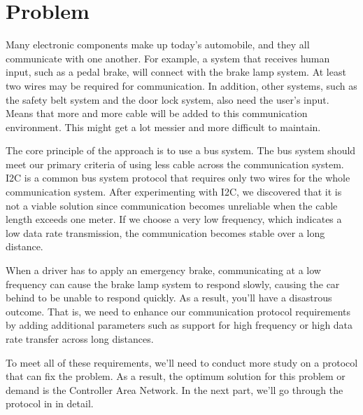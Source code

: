 
\section{Problem}

Many electronic components make up today's automobile, and they all communicate with one another. For example, a system that receives human input, such as a pedal brake, will connect with the brake lamp system. At least two wires may be required for communication. In addition, other systems, such as the safety belt system and the door lock system, also  need the user's input. Means that more and more cable will be added to this communication environment. This might get a lot messier and more difficult to maintain.

The core principle of the approach is to use a bus system. The bus system should meet our primary criteria of using less cable across the communication system. I2C is a common bus system protocol that requires only two wires for the whole communication system. After experimenting with I2C, we discovered that it is not a viable solution since communication becomes unreliable when the cable length exceeds one meter. If we choose a very low frequency, which indicates a low data rate transmission, the communication becomes stable over a long distance.

When a driver has to apply an emergency brake, communicating at a low frequency can cause the brake lamp system to respond slowly, causing the car behind to be unable to respond quickly. As a result, you'll have a disastrous outcome. That is, we need to enhance our communication protocol requirements by adding additional parameters such as support for high frequency or high data rate transfer across long distances.

To meet all of these requirements, we'll need to conduct more study on a protocol that can fix the problem. As a result, the optimum solution for this problem or demand is the Controller Area Network. In the next part, we'll go through the protocol in in detail.